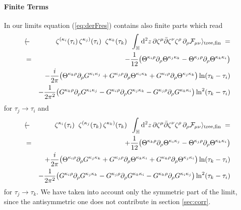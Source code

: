 \documentclass[a4paper,12pt]{article}
\let\bra=\langle        \let\ket=\rangle
\newcommand {\ud} {\mathrm{d}}
\newcommand {\cF} {{\cal F}}
\newcommand {\bbH}{\mathbb{H}}
\newcommand {\Back}{\!\!\!\!\!}
\begin{document}
\paragraph{Finite Terms}

In our limits equation (\ref{eq:derFres}) contains also finite parts which read
\begin{eqnarray}
  \label{eq:tifinite}
   - \Back &\bra&\Back\zeta^{(\kappa_i}(\tau_i)\,\zeta^{\kappa_j)}(\tau_i) \;\;
       \zeta^{\kappa_k}(\tau_k) \;\;
      \int _\bbH \ud^2z \, 
      \partial \zeta^\mu \bar\partial \zeta^\nu \zeta^\rho \, 
      \partial_\rho \cF_{\mu\nu}\ket_{\mathrm{tree, fin}} \; = \nonumber \\
   &=& - \frac {1}{12} \bigl(
         \Theta^{\kappa_i \rho} \partial_\rho \Theta^{\kappa_j \kappa_k} -
         \Theta^{\kappa_j \rho} \partial_\rho \Theta^{\kappa_k \kappa_i}
         \bigr) \nonumber \\
   & & - \frac {i}{2\pi} \bigl(
         \Theta^{\kappa_k \rho} \partial_\rho G^{\kappa_i \kappa_j} +
         G^{\kappa_j \rho} \partial_\rho \Theta^{\kappa_i \kappa_k} +
         G^{\kappa_i \rho} \partial_\rho \Theta^{\kappa_j \kappa_k} \bigr) 
         \ln(\tau_k-\tau_i) \nonumber\\
   & & - \frac {1}{2\pi^2} \bigl(
         G^{\kappa_k \rho} \partial_\rho G^{\kappa_i \kappa_j} -
         G^{\kappa_i \rho} \partial_\rho G^{\kappa_j \kappa_k} -
         G^{\kappa_j \rho} \partial_\rho G^{\kappa_k \kappa_i} \bigr)
         \ln^2 (\tau_k-\tau_i)
\end{eqnarray}
for $\tau_j \rightarrow \tau_i$ and 
\begin{eqnarray}
  \label{eq:tkfinite}
   - \Back&\bra&\Back \zeta^{\kappa_i}(\tau_i) \;\; 
      \zeta^{(\kappa_j}(\tau_k) \, \zeta^{\kappa_k)}(\tau_k) \;\;
      \int _\bbH \ud^2z \, 
      \partial \zeta^\mu \bar\partial \zeta^\nu \zeta^\rho \, 
      \partial_\rho \cF_{\mu\nu}\ket_{\mathrm{tree, fin}} \; = \nonumber \\  
   &=& + \frac {1}{12} \bigl(
         \Theta^{\kappa_k \rho} \partial_\rho \Theta^{\kappa_i\kappa_j} -
         \Theta^{\kappa_j \rho} \partial_\rho \Theta^{\kappa_k\kappa_i}
         \bigr) \nonumber \\
   & & + \frac {i}{2\pi} \bigl(
         \Theta^{\kappa_i \rho} \partial_\rho G^{\kappa_j \kappa_k} +
         G^{\kappa_j \rho} \partial_\rho \Theta^{\kappa_k \kappa_i} +
         G^{\kappa_k \rho} \partial_\rho \Theta^{\kappa_j \kappa_i} \bigr) 
         \ln(\tau_k-\tau_i) \nonumber\\
   & & - \frac {1}{2\pi^2} \bigl(
         G^{\kappa_i \rho} \partial_\rho G^{\kappa_j \kappa_k} -
         G^{\kappa_j \rho} \partial_\rho G^{\kappa_k \kappa_i} -
         G^{\kappa_k \rho} \partial_\rho G^{\kappa_i \kappa_j} \bigr)
         \ln^2 (\tau_k-\tau_i)
\end{eqnarray}
for $\tau_j \rightarrow \tau_k$. We have taken into account only the
symmetric part of the limit, since the antisymmetric one does not
contribute in section \ref{sec:corr}.
\end{document}

